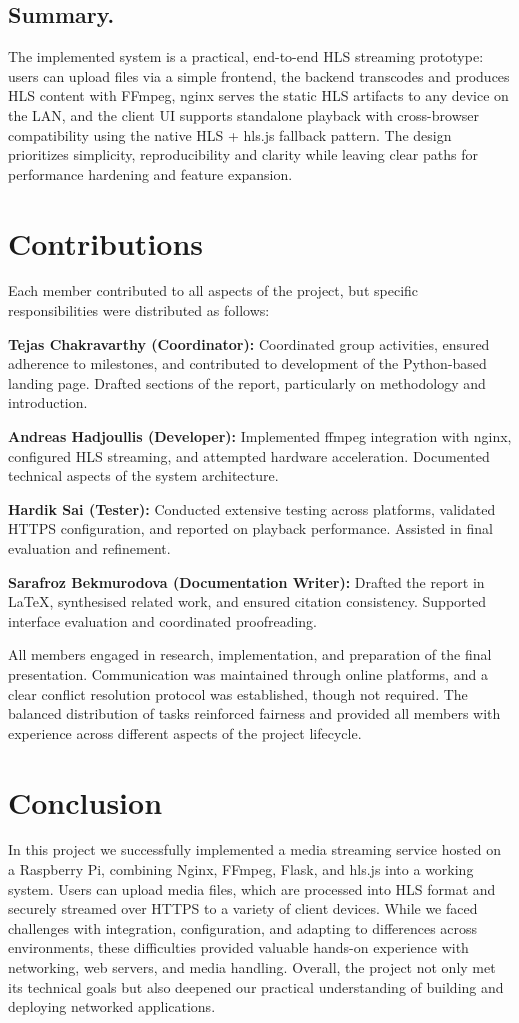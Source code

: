 \documentclass[11pt]{report}
\begin{document}
\section{Summary.}
The implemented system is a practical, end-to-end HLS streaming prototype: users can upload files via a simple frontend, the backend transcodes and produces HLS content with FFmpeg, nginx serves the static HLS artifacts to any device on the LAN, and the client UI supports standalone playback with cross-browser compatibility using the native HLS + hls.js fallback pattern. The design prioritizes simplicity, reproducibility and clarity while leaving clear paths for performance hardening and feature expansion.

\chapter{Contributions}
Each member contributed to all aspects of the project, but specific responsibilities were distributed as follows:

\textbf{Tejas Chakravarthy (Coordinator):} Coordinated group activities, ensured adherence to milestones, and contributed to development of the Python-based landing page. Drafted sections of the report, particularly on methodology and introduction.

\textbf{Andreas Hadjoullis (Developer):} Implemented ffmpeg integration with nginx, configured HLS streaming, and attempted hardware acceleration. Documented technical aspects of the system architecture.

\textbf{Hardik Sai (Tester):} Conducted extensive testing across platforms, validated HTTPS configuration, and reported on playback performance. Assisted in final evaluation and refinement.

\textbf{Sarafroz Bekmurodova (Documentation Writer):} Drafted the report in LaTeX, synthesised related work, and ensured citation consistency. Supported interface evaluation and coordinated proofreading.

All members engaged in research, implementation, and preparation of the final presentation. Communication was maintained through online platforms, and a clear conflict resolution protocol was established, though not required. The balanced distribution of tasks reinforced fairness and provided all members with experience across different aspects of the project lifecycle.

\chapter{Conclusion}
In this project we successfully implemented a media streaming service hosted on a Raspberry Pi, combining Nginx, FFmpeg, Flask, and hls.js into a working system. Users can upload media files, which are processed into HLS format and securely streamed over HTTPS to a variety of client devices. While we faced challenges with integration, configuration, and adapting to differences across environments, these difficulties provided valuable hands-on experience with networking, web servers, and media handling. Overall, the project not only met its technical goals but also deepened our practical understanding of building and deploying networked applications.
\end{document}
